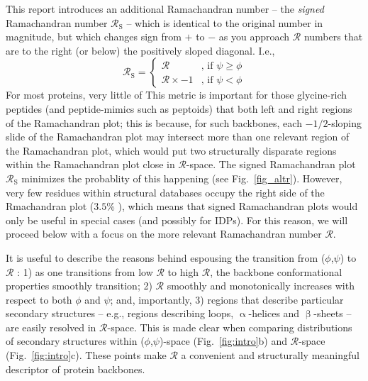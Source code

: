 \documentclass[fleqn,10pt]{wlpeerj} %
\newcommand{\round}[1]{\left \lfloor #1 \right \rceil }
\newcommand{\Fig}[1]{Fig.~\ref{#1}}
\begin{document}
This report introduces an additional Ramachandran number -- the \textit{signed} Ramachandran number $\mathcal{R}_\textrm{S}$ -- which is identical to the original number in magnitude, but which changes sign from $+$ to $-$ as you approach $\mathcal{R}$ numbers that are to the right (or below) the positively sloped diagonal. I.e., 
\begin{equation}
\mathcal{R}_\textrm{S} = 
\begin{cases}
    \mathcal{R}         &\text{, if } \psi \geq \phi  \\
    \mathcal{R}\times-1 &\text{, if } \psi   <  \phi
\end{cases}\label{eqn:signed}
\end{equation}
For most proteins, very little of 
This metric is important for those glycine-rich peptides (and peptide-mimics such as peptoids) that both left and right regions of the Ramachandran plot; this is because, for such backbones, each $-1/2$-sloping slide of the Ramachandran plot may intersect more than one relevant region of the Ramachandran plot, which would put two structurally disparate regions within the Ramachandran plot close in $\mathcal{R}$-space. The signed Ramachandran plot $\mathcal{R}_\textrm{S}$ minimizes the probablity of this happening (see \Fig{fig_altr}). However, very few residues within structural databases occupy the right side of the Rmachandran plot ($3.5$\% ), which means that signed Ramachandran plots would only be useful in  special cases (and possibly for IDPs). For this reason, we will proceed below with a focus on the more relevant Ramachandran number $\mathcal{R}$.

It is useful to describe the reasons behind espousing the transition from ($\phi$,$\psi$) to $\mathcal{R}$ \citep{MannigeKunduWhitelam2016}: 1) as one transitions from low $\mathcal{R}$ to high $\mathcal{R}$, the backbone conformational properties smoothly transition; 2) $\mathcal{R}$ smoothly and monotonically increases with respect to both $\phi$ and $\psi$; and, importantly, 3) regions that describe particular secondary structures -- e.g., regions describing loops, $\upalpha$-helices and $\upbeta$-sheets -- are easily resolved in $\mathcal{R}$-space. This is made clear when comparing distributions of secondary structures within ($\phi$,$\psi$)-space (\Fig{fig:intro}b) and $\mathcal{R}$-space (\Fig{fig:intro}c). These points make  $\mathcal{R}$ a convenient and structurally meaningful descriptor of protein backbones.

\end{document}
